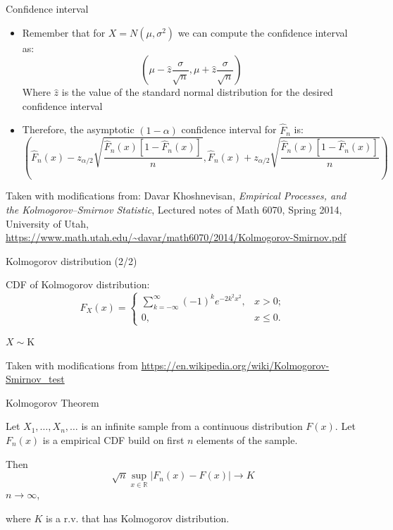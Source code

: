 \documentclass{beamer}
\begin{document}
\begin{frame}
{\centerline{Confidence interval}}

\begin{itemize}
\item Remember that for $X=N(\mu,\sigma^2)$ we can compute the confidence interval as:
$$ ( \mu - \hat{z} \frac{\sigma}{\sqrt{n}},  \mu +  \hat{z} \frac{\sigma}{\sqrt{n}} )$$
Where $ \hat{z}$ is the value of the standard normal distribution for the desired confidence interval
\item Therefore, the asymptotic $(1 - \alpha)$ confidence interval for $\widehat {F}_{n}$ is:
$$ ( \widehat {F}_{n} (x)  - z_{\alpha/2} \sqrt{\frac{\widehat {F}_{n} (x) \left [ 1 - \widehat {F}_{n} (x) \right ]}{n}},  \widehat {F}_{n} (x) +  z_{\alpha/2} \sqrt{\frac{\widehat {F}_{n} (x) \left [ 1 - \widehat {F}_{n} (x) \right ]}{n}} ) $$

\end{itemize}

\begin{center}
\tiny{Taken with modifications from: Davar Khoshnevisan, \textit{Empirical Processes, and the Kolmogorov–Smirnov Statistic}, Lectured notes of Math 6070, Spring 2014, University of Utah, \url{https://www.math.utah.edu/~davar/math6070/2014/Kolmogorov-Smirnov.pdf}}
\end{center}

\end{frame}



\begin{frame}
{\centerline{Kolmogorov distribution (2/2)}}

CDF of Kolmogorov distribution:
$$F_X(x) =
\begin{cases}
\sum\limits_{k=-\infty}^{\infty} (-1)^k e^{-2k^2 x^2}, & x > 0; \\
0, & x \leqslant 0.
\end{cases}
$$

$X\sim \mathrm{K}$

\begin{center}
\tiny{Taken with modifications from \url{https://en.wikipedia.org/wiki/Kolmogorov-Smirnov_test}}
\end{center}

\end{frame}


\begin{frame}
{\centerline{Kolmogorov Theorem}}

Let $X_1,\ldots,X_n,\ldots$ is an infinite sample from a continuous distribution $F(x)$. Let $F_n(x)$ is a empirical CDF build on first $n$ elements of the sample. 
\newline

Then
$$\sqrt{n} \sup\limits_{x\in \mathbb{R}} \left| F_n(x) - F(x) \right| \to K$$  $n \to \infty$,


where  $K$ is a r.v. that has Kolmogorov distribution.

\end{frame}
\end{document}
